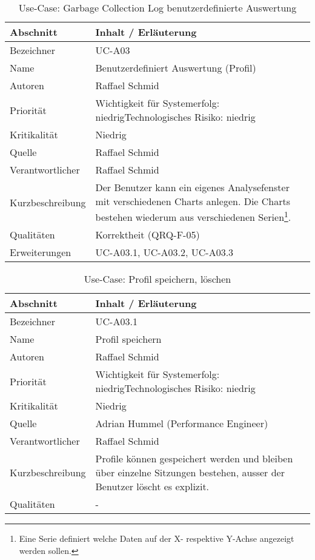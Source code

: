 \begin{longtable}{|p{4cm}|p{10.5cm}|}
\caption{Use-Case: Garbage Collection Log benutzerdefinierte Auswertung }\\\hline
   \textbf{Abschnitt} & \textbf{Inhalt / Erläuterung} \\\hline
   Bezeichner & UC-A03\\\hline
   Name & Benutzerdefiniert Auswertung (Profil)\\\hline
   Autoren & Raffael Schmid\\\hline
   Priorität & Wichtigkeit für Systemerfolg: niedrig\newline Technologisches Risiko: niedrig\\\hline
   Kritikalität & Niedrig\\\hline
   Quelle & Raffael Schmid\\\hline
   Verantwortlicher & Raffael Schmid\\\hline
   Kurzbeschreibung & Der Benutzer kann ein eigenes Analysefenster mit verschiedenen Charts anlegen. Die Charts bestehen wiederum aus verschiedenen Serien\footnote{Eine Serie definiert welche Daten auf der X- respektive Y-Achse angezeigt werden sollen.}.\\\hline
   Qualitäten & Korrektheit (QRQ-F-05)\\\hline
   Erweiterungen & UC-A03.1, UC-A03.2, UC-A03.3\\\hline
\end{longtable}

\begin{longtable}{|p{4cm}|p{10.5cm}|}
\caption{Use-Case: Profil speichern, löschen }\\\hline
   \textbf{Abschnitt} & \textbf{Inhalt / Erläuterung} \\\hline
   Bezeichner & UC-A03.1\\\hline
   Name & Profil speichern\\\hline
   Autoren & Raffael Schmid\\\hline
   Priorität & Wichtigkeit für Systemerfolg: niedrig\newline Technologisches Risiko: niedrig\\\hline
   Kritikalität & Niedrig\\\hline
   Quelle & Adrian Hummel (Performance Engineer)\\\hline
   Verantwortlicher & Raffael Schmid\\\hline
   Kurzbeschreibung & Profile können gespeichert werden und bleiben über einzelne Sitzungen bestehen, ausser der Benutzer löscht es explizit.\\\hline
   Qualitäten & -\\\hline
\end{longtable}

